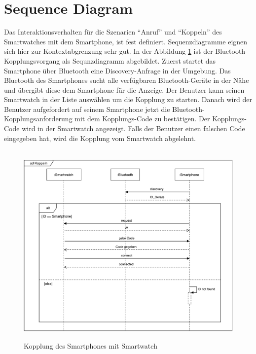 \section{Sequence Diagram}
Das Interaktionsverhalten für die Szenarien ``Anruf'' und ``Koppeln'' des Smartwatches mit dem Smartphone, ist fest definiert. Sequenzdiagramme eignen sich hier zur Kontextabgrenzung sehr gut.
In der Abbildung \ref{fig:kopplung} ist der Bluetooth-Kopplungsvorgang als Sequnzdiagramm abgebildet.
Zuerst startet das Smartphone über Bluetooth eine Discovery-Anfrage in der Umgebung.
Das Bluetooth des Smartphones sucht alle verfügbaren Bluetooth-Geräte in der Nähe und übergibt diese dem Smartphone für die Anzeige.
Der Benutzer kann seinen Smartwatch in der Liste auswählen um die Kopplung zu starten.
Danach wird der Benutzer aufgefordert auf seinem Smartphone jetzt die Bluetooth-Kopplungsanforderung mit dem Kopplungs-Code zu bestätigen. Der Kopplungs-Code wird in der Smartwatch angezeigt.
Falls der Benutzer einen falschen Code eingegeben hat, wird die Kopplung vom Smartwatch
abgelehnt.

\begin{figure}[H]
\centering\
\includegraphics[width=14cm]{img/KoppelnSequenz}
\caption{Kopplung des Smartphones mit Smartwatch}\label{fig:kopplung}
\end{figure}


